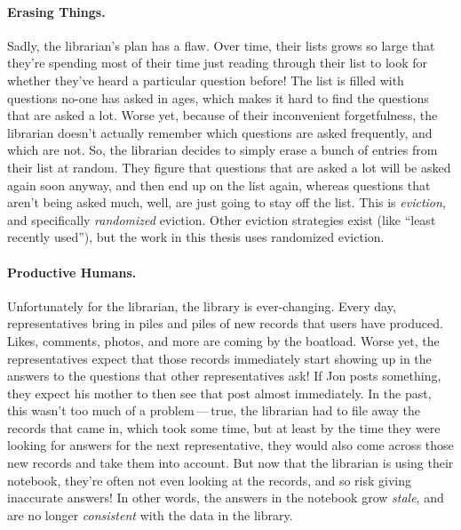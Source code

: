 \paragraph{Erasing Things.}
%
Sadly, the librarian's plan has a flaw. Over time, their lists grows so large
that they're spending most of their time just reading through their list to look
for whether they've heard a particular question before! The list is filled with
questions no-one has asked in ages, which makes it hard to find the questions
that are asked a lot. Worse yet, because of their inconvenient forgetfulness,
the librarian doesn't actually remember which questions are asked frequently,
and which are not. So, the librarian decides to simply erase a bunch of entries
from their list at random. They figure that questions that are asked a lot will
be asked again soon anyway, and then end up on the list again, whereas questions
that aren't being asked much, well, are just going to stay off the list. This is
\textit{eviction}, and specifically \textit{randomized} eviction. Other eviction
strategies exist (like ``least recently used''), but the work in this thesis
uses randomized eviction.

\paragraph{Productive Humans.}
%
Unfortunately for the librarian, the library is ever-changing. Every day,
representatives bring in piles and piles of new records that users have
produced. Likes, comments, photos, and more are coming by the boatload. Worse
yet, the representatives expect that those records immediately start showing up
in the answers to the questions that other representatives ask! If Jon posts
something, they expect his mother to then see that post almost immediately. In
the past, this wasn't too much of a problem\,---\,true, the librarian had to
file away the records that came in, which took some time, but at least by the
time they were looking for answers for the next representative, they would also
come across those new records and take them into account. But now that the
librarian is using their notebook, they're often not even looking at the
records, and so risk giving inaccurate answers! In other words, the answers in
the notebook grow \textit{stale}, and are no longer \textit{consistent} with the
data in the library.

